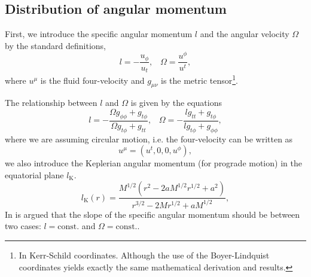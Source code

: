 \documentclass{aa}
\begin{document}
\subsection{Distribution of angular momentum}
First, we introduce the specific angular momentum $l$ and the angular velocity $\Omega$ by the standard definitions,
\begin{equation}
l = - \frac{u_{\phi}}{u_t}, \;\;\; \Omega = \frac{u^{\phi}}{u^t},
\end{equation}
where $u^{\mu}$ is the fluid four-velocity and $g_{\mu\nu}$ is the metric tensor\footnote{In Kerr-Schild coordinates. Although the use of the Boyer-Lindquist coordinates yields exactly the same mathematical derivation and results.}.

The relationship between $l$ and $\Omega$ is given by the equations
\begin{equation}
l = - \frac{\Omega g_{\phi\phi} + g_{t\phi}}{\Omega g_{t\phi} + g_{tt}}, \;\;\; \Omega = - \frac{l g_{tt} + g_{t\phi}}{l g_{t\phi} + g_{\phi\phi}},
\end{equation}
where we are assuming circular motion, i.e. the four-velocity can be written as
\begin{equation}
u^{\mu} = (u^t, 0, 0, u^{\phi}),
\end{equation}
we also introduce the Keplerian angular momentum (for prograde motion) in the equatorial plane $l_{\mathrm{K}}$. 
\begin{equation}\label{eq:kepler}
l_{\mathrm{K}}(r) = \frac{M^{1/2}(r^{2}-2aM^{1/2}r^{1/2}+a^{2})}{r^{3/2}-2Mr^{1/2}+aM^{1/2}},
\end{equation}
In \citet{Jaroszynski:1980} is argued that the slope of the specific angular momentum should be between two cases: $l = \mathrm{const.}$ and $\Omega = \mathrm{const.}$. 

\end{document}
